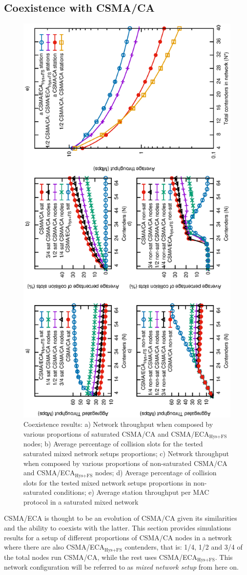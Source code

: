 	\subsection{Coexistence with CSMA/CA}\label{coexistance-w-csmaca}
	
	\begin{figure}[tb]
		\centering
		\includegraphics[width=0.5\linewidth,angle=-90]{figures/tonFigs/coexistence-combined.eps}
	\caption{Coexistence results: a) Network throughput when composed by various proportions of saturated CSMA/CA and CSMA/ECA$_{\text{Hys+FS}}$ nodes; b) Average percentage of collision slots for the tested saturated mixed network setups proportions; c) Network throughput when composed by various proportions of non-saturated CSMA/CA and CSMA/ECA$_{\text{Hys+FS}}$ nodes; d) Average percentage of collision slots for the tested mixed network setups proportions in non-saturated conditions; e) Average station throughput per MAC protocol in a saturated mixed network}
		\label{fig:coexResults}
	\end{figure}
	
	
	CSMA/ECA is thought to be an evolution of CSMA/CA given its similarities and the ability to coexists with the latter. This section provides simulations results for a setup of different proportions of CSMA/CA nodes in a network where there are also CSMA/ECA$_{\text{Hys+FS}}$ contenders, that is: 1/4, 1/2 and 3/4 of the total nodes run CSMA/CA, while the rest uses CSMA/ECA$_{\text{Hys+FS}}$. This network configuration will be referred to as \emph{mixed network setup} from here on.	
